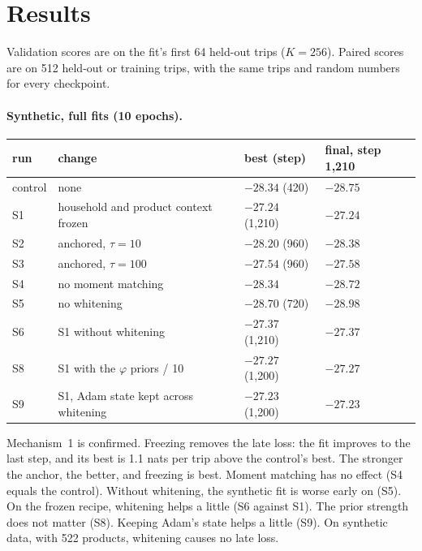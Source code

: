 \documentclass[11pt]{article}
\theoremstyle{remark}\newtheorem{remark}{Remark}
\begin{document}
\section{Results}\label{sec:results}

Validation scores are on the fit's first 64 held-out trips ($K=256$). Paired scores are on 512
held-out or training trips, with the same trips and random numbers for every checkpoint.

\paragraph{Synthetic, full fits (10 epochs).}
\begin{center}\small
\begin{tabular}{llll}
\toprule
run & change & best (step) & final, step 1,210\\
\midrule
control & none & $-28.34$ (420) & $-28.75$\\
S1 & household and product context frozen & $\mathbf{-27.24}$ (1,210) & $\mathbf{-27.24}$\\
S2 & anchored, $\tau=10$ & $-28.20$ (960) & $-28.38$\\
S3 & anchored, $\tau=100$ & $-27.54$ (960) & $-27.58$\\
S4 & no moment matching & $-28.34$ & $-28.72$\\
S5 & no whitening & $-28.70$ (720) & $-28.98$\\
S6 & S1 without whitening & $-27.37$ (1,210) & $-27.37$\\
S8 & S1 with the $\varphi$ priors / 10 & $-27.27$ (1,200) & $-27.27$\\
S9 & S1, Adam state kept across whitening & $\mathbf{-27.23}$ (1,200) & $-27.23$\\
\bottomrule
\end{tabular}
\end{center}
Mechanism~1 is confirmed. Freezing removes the late loss: the fit improves to the last step, and
its best is 1.1 nats per trip above the control's best. The stronger the anchor, the better, and
freezing is best. Moment matching has no effect (S4 equals the control). Without whitening, the
synthetic fit is worse early on (S5). On the frozen recipe, whitening helps a little (S6 against
S1). The prior strength does not matter (S8). Keeping Adam's state helps a little (S9). On
synthetic data, with 522 products, whitening causes no late loss.
\end{document}
